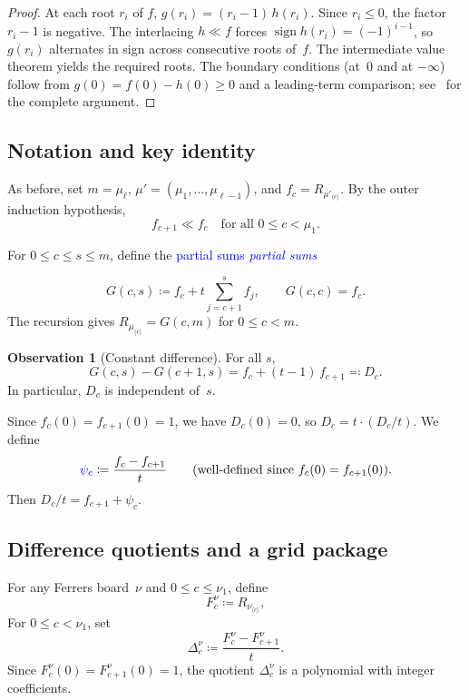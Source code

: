 \documentclass[11pt,reqno]{amsart}
\theoremstyle{definition}
\newtheorem{observation}[theorem]{Observation}
\newcommand{\defin}[1]{%
\relax\ifmmode%
\textcolor{blue}{#1}%
\else \textcolor{blue}{\emph{#1}}%
\fi%
}
\newcommand{\interl}{\ll}
\begin{document}
\begin{proof}
At each root $r_i$ of $f$, $g(r_i) = (r_i - 1)\,h(r_i)$.
Since $r_i \leq 0$, the factor $r_i - 1$ is negative.
The interlacing $h \interl f$ forces $\operatorname{sign} h(r_i) = (-1)^{i-1}$,
so $g(r_i)$ alternates in sign across consecutive roots of~$f$.
The intermediate value theorem yields the required roots.
The boundary conditions (at~$0$ and at $-\infty$) follow from
$g(0) = f(0) - h(0) \geq 0$ and a leading-term comparison;
see~\cite{AlexanderssonJaldevik2025x} for the complete argument.
\end{proof}


\subsection{Notation and key identity}

As before, set $m = \mu_\ell$, $\mu' = (\mu_1, \dotsc, \mu_{\ell-1})$,
and $f_c = R_{\mu'_{\langle c \rangle}}$.
By the outer induction hypothesis,
\begin{equation}\label{eq:outer_ih}
  f_{c+1} \interl f_c \quad\text{for all } 0 \leq c < \mu_1.
\end{equation}

For $0 \leq c \leq s \leq m$, define the \defin{partial sums}
\[
  G(c, s)
  \coloneqq f_c + t \sum_{j=c+1}^{s} f_j,
  \qquad G(c, c) = f_c.
\]
The recursion gives $R_{\mu_{\langle c \rangle}} = G(c, m)$ for $0 \leq c < m$.

\begin{observation}[Constant difference]\label{obs:const_diff}
For all $s$,
\[
  G(c, s) - G(c{+}1, s) = f_c + (t-1)\,f_{c+1}
  \eqqcolon D_c.
\]
In particular, $D_c$ is independent of~$s$.
\end{observation}

Since $f_c(0) = f_{c+1}(0) = 1$, we have $D_c(0) = 0$, so $D_c = t \cdot (D_c / t)$.
We define
\[
  \defin{\psi_c} \coloneqq \frac{f_c - f_{c+1}}{t}
  \qquad\text{(well-defined since $f_c(0) = f_{c+1}(0)$)}.
\]
Then $D_c / t = f_{c+1} + \psi_c$.

\subsection{Difference quotients and a grid package}\label{sec:grid_package}

For any Ferrers board~$\nu$ and $0 \leq c \leq \nu_1$, define
\[
  F_c^\nu \coloneqq R_{\nu_{\langle c \rangle}},
\]
For $0 \leq c < \nu_1$, set
\[
  \Delta_c^\nu \coloneqq \frac{F_c^\nu - F_{c+1}^\nu}{t}.
\]
Since $F_c^\nu(0) = F_{c+1}^\nu(0) = 1$, the quotient $\Delta_c^\nu$
is a polynomial with integer coefficients.
\end{document}
